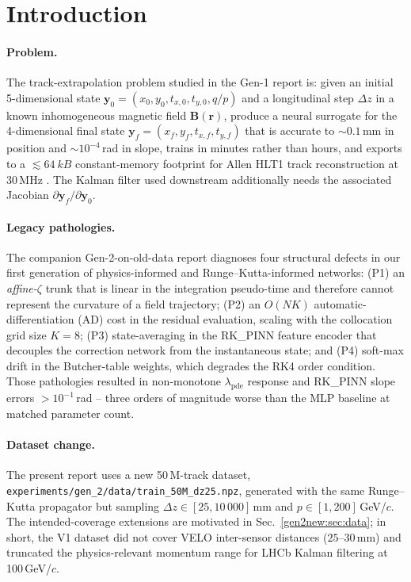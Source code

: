 \documentclass[a4paper,11pt]{article}
\newcommand{\SI}[2]{#1~#2}
\newcommand{\qop}{q/p}
\newcommand{\dz}{\Delta z}
\newcommand{\state}{\mathbf{y}}
\begin{document}
\section{Introduction}\label{gen2new:sec:intro}

\paragraph{Problem.}
The track-extrapolation problem studied in the Gen-1 report
\cite{gen1report} is: given an initial 5-dimensional state
$\state_0=(x_0,y_0,t_{x,0},t_{y,0},\qop)$ and a longitudinal step
$\dz$ in a known inhomogeneous magnetic field
$\mathbf{B}(\mathbf{r})$, produce a neural surrogate for the 4-dimensional
final state $\state_f=(x_f,y_f,t_{x,f},t_{y,f})$ that is accurate to
${\sim}0.1$\,mm in position and ${\sim}10^{-4}$\,rad in slope, trains
in minutes rather than hours, and exports to a ${\lesssim}\SI{64}{kB}$
constant-memory footprint for Allen HLT1 track reconstruction at
30\,MHz \cite{Allen}. The Kalman filter used downstream
\cite{Fruhwirth1987,LHCb2008} additionally needs the associated
Jacobian $\partial\state_f/\partial\state_0$.

\paragraph{Legacy pathologies.}
The companion Gen-2-on-old-data report \cite{gen2oldreport} diagnoses
four structural defects in our first generation of
physics-informed and Runge--Kutta-informed networks:
(P1) an \emph{affine-$\zeta$} trunk that is linear in the integration
pseudo-time and therefore cannot represent the curvature of a field
trajectory; (P2) an $O(NK)$ automatic-differentiation (AD) cost in
the residual evaluation, scaling with the collocation grid size
$K=8$; (P3) state-averaging in the RK\_PINN feature encoder that
decouples the correction network from the instantaneous state; and
(P4) soft-max drift in the Butcher-table weights, which degrades the
RK4 order condition. Those pathologies resulted in non-monotone
$\lambda_{\mathrm{pde}}$ response and RK\_PINN slope errors
${>}10^{-1}$\,rad -- three orders of magnitude worse than the MLP
baseline at matched parameter count.

\paragraph{Dataset change.}
The present report uses a new 50\,M-track dataset,
\texttt{experiments/gen\_2/data/train\_50M\_dz25.npz}, generated with
the same Runge--Kutta propagator but sampling
$\dz\in[25,10\,000]$\,mm and $p\in[1,200]$\,GeV/$c$. The
intended-coverage extensions are motivated in
Sec.~\ref{gen2new:sec:data}; in short, the V1 dataset did not cover
VELO inter-sensor distances ($25$--$30$\,mm) and truncated the
physics-relevant momentum range for LHCb Kalman filtering at
100\,GeV/$c$.
\end{document}
